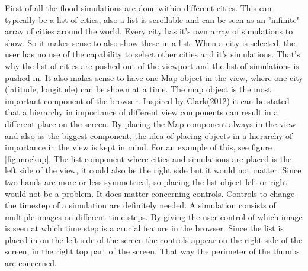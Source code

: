 First of all the flood simulations are done within different cities. This can typically be a list of cities, also a list is scrollable and can be seen as an "infinite" array of cities around the world. Every city has it's own array of simulations to show. So it makes sense to also show these in a list. When a city is selected, the user has no use of the capability to select other cities and it's simulations. That's why the list of cities are pushed out of the viewport and the list of simulations is pushed in. 
It also makes sense to have one Map object in the view, where one city (latitude, longitude) can be shown at a time. The map object is the most important component of the browser. Inspired by Clark(2012) it can be stated that a hierarchy in importance of different view components can result in a different place on the screen. By placing the Map component always in the view and also as the biggest component, the idea of placing objects in a hierarchy of importance in the view is kept in mind. For an example of this, see figure \ref{fig:mockup}.
The list component where cities and simulations are placed is the left side of the view, it could also be the right side but it would not matter. Since two hands are more or less symmetrical, so placing the list object left or right would not be a problem. It does matter concerning controls. Controls to change the timestep of a simulation are definitely needed. A simulation consists of multiple images on different time steps. By giving the user control of which image is seen at which time step is a crucial feature in the browser. Since the list is placed in on the left side of the screen the controls appear on the right side of the screen, in the right top part of the screen. That way the perimeter of the thumbs are concerned.
